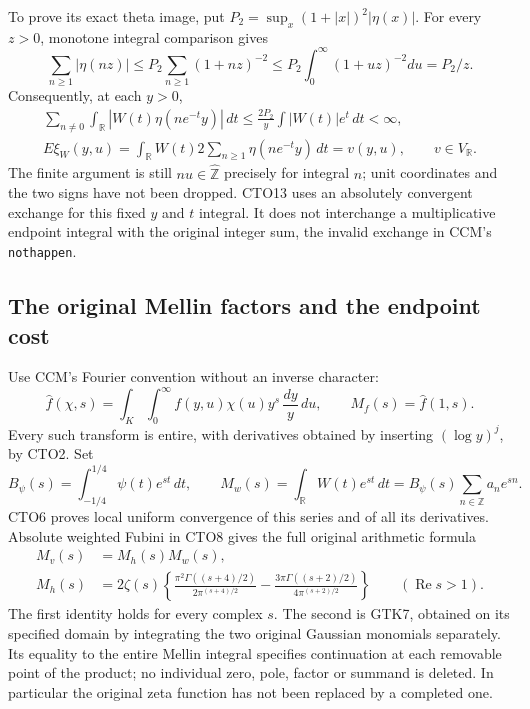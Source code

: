 To prove its exact theta image, put
$P_2=\sup_x(1+|x|)^2|\eta(x)|$. For every $z>0$, monotone
integral comparison gives
\[
\sum_{n\ge1}|\eta(nz)|
 \le P_2\sum_{n\ge1}(1+nz)^{-2}
 \le P_2\int_0^\infty(1+uz)^{-2}du=P_2/z.
\]
Consequently, at each $y>0$,
\begin{equation}\tag{CTO13}
\begin{gathered}
\sum_{n\ne0}\int_{\mathbb R}
 |W(t)\eta(ne^{-t}y)|\,dt
 \le\frac{2P_2}{y}\int|W(t)|e^t\,dt<\infty,\\
E\xi_W(y,u)
 =\int_{\mathbb R}W(t)
                  2\sum_{n\ge1}\eta(ne^{-t}y)\,dt
 =v(y,u),\qquad v\in V_{\mathbb R}.
\end{gathered}
\end{equation}
The finite argument is still $nu\in\widehat{\mathbb Z}$ precisely
for integral $n$; unit coordinates and the two signs have not
been dropped. CTO13 uses an absolutely convergent exchange for
this fixed $y$ and $t$ integral. It does not interchange a
multiplicative endpoint integral with the original integer sum,
the invalid exchange in CCM's \texttt{nothappen}.

\subsection{The original Mellin factors and the endpoint cost}

Use CCM's Fourier convention without an inverse character:
\begin{equation}\tag{CTO14}
\widehat f(\chi,s)
 =\int_K\int_0^\infty f(y,u)\chi(u)y^s\,\frac{dy}{y}\,du,
\qquad M_f(s)=\widehat f(1,s).
\end{equation}
Every such transform is entire, with derivatives obtained by
inserting $(\log y)^j$, by CTO2. Set
\[
B_\psi(s)=\int_{-1/4}^{1/4}\psi(t)e^{st}\,dt,
\qquad
M_w(s)=\int_{\mathbb R}W(t)e^{st}\,dt
       =B_\psi(s)\sum_{n\in\mathbb Z}a_ne^{sn}.
\]
CTO6 proves local uniform convergence of this series and of all
its derivatives. Absolute weighted Fubini in CTO8 gives the full
original arithmetic formula
\begin{equation}\tag{CTO15}
\begin{split}
M_v(s)&=M_h(s)M_w(s),\\
M_h(s)&=2\zeta(s)\left\{
 \frac{\pi^2\Gamma((s+4)/2)}{2\pi^{(s+4)/2}}
 -\frac{3\pi\Gamma((s+2)/2)}{4\pi^{(s+2)/2}}
 \right\}\qquad(\operatorname{Re}s>1).
\end{split}
\end{equation}
The first identity holds for every complex $s$. The second is
GTK7, obtained on its specified domain by integrating the two
original Gaussian monomials separately. Its equality to the
entire Mellin integral specifies continuation at each removable
point of the product; no individual zero, pole, factor or summand
is deleted. In particular the original zeta function has not been
replaced by a completed one.

